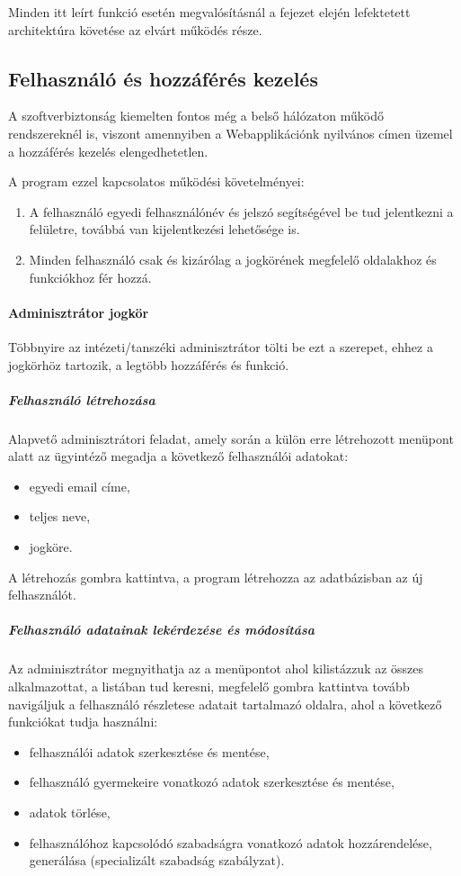 Minden itt leírt funkció esetén megvalósításnál a fejezet elején lefektetett architektúra követése az elvárt működés része.

\subsection{Felhasználó és hozzáférés kezelés}

A szoftverbiztonság kiemelten fontos még a belső hálózaton működő rendszereknél is, viszont amennyiben a Webapplikációnk nyilvános címen üzemel a hozzáférés kezelés elengedhetetlen. 

A program ezzel kapcsolatos működési követelményei:
\begin{enumerate}
	\item A felhasználó egyedi felhasználónév és jelszó segítségével be tud jelentkezni a felületre, továbbá van kijelentkezési lehetősége is.
	\item Minden felhasználó csak és kizárólag a jogkörének megfelelő oldalakhoz és funkciókhoz fér hozzá.
\end{enumerate}

\paragraph{Adminisztrátor jogkör}
Többnyire az intézeti/tanszéki adminisztrátor tölti be ezt a szerepet, ehhez a jogkörhöz tartozik, a legtöbb hozzáférés és funkció.
\subparagraph{Felhasználó létrehozása}
Alapvető adminisztrátori feladat, amely során a külön erre létrehozott menüpont alatt az ügyintéző megadja a következő felhasználói adatokat:
\begin{itemize}
	\item egyedi email címe,
	\item teljes neve,
	\item jogköre.
\end{itemize}
A létrehozás gombra kattintva, a program létrehozza az adatbázisban az új felhasználót.

\subparagraph{Felhasználó adatainak lekérdezése és módosítása}
Az adminisztrátor megnyithatja az a menüpontot ahol kilistázzuk az összes alkalmazottat, a listában tud keresni, megfelelő gombra kattintva tovább navigáljuk a felhasználó részletese adatait tartalmazó oldalra, ahol a következő funkciókat tudja használni: 
\begin{itemize}
	\item felhasználói adatok szerkesztése és mentése,
	\item felhasználó gyermekeire vonatkozó adatok szerkesztése és mentése,
	\item adatok törlése,
	\item felhasználóhoz kapcsolódó szabadságra vonatkozó adatok hozzárendelése, generálása (specializált szabadság szabályzat). 
\end{itemize}

